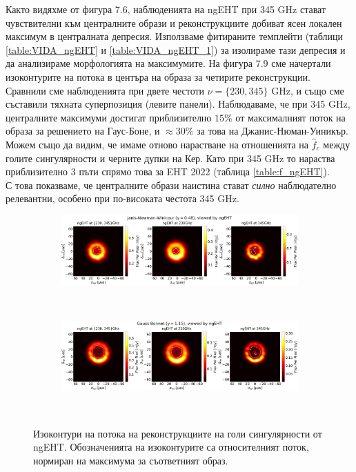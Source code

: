 Както видяхме от фигура 7.6, наблюденията на ngEHT при 345 GHz стават чувствителни към централните образи и реконструкциите добиват ясен локален максимум в централната депресия. Използваме фитираните темплейти (таблици \ref{table:VIDA_ngEHT} и \ref{table:VIDA_ngEHT_1}) за изолираме тази депресия и да анализираме морфологията на максимумите. На фигура 7.9 сме начертали изоконтурите на потока в центъра на образа за четирите реконструкции. Сравнили сме наблюденията при двете честоти $\nu = \{230, 345\}$ GHz, и също сме съставили тяхната суперпозиция (левите панели). Наблюдаваме, че при 345 GHz, централните максимуми достигат приблизително $15\%$ от максималният поток на образа за решението на Гаус-Боне, и $\approx 30\%$ за това на Джанис-Нюман-Уиникър. Можем също да видим, че имаме отново нарастване на отношенията на $\hat{f}_c$ между голите сингулярности и черните дупки на Кер. Като при 345 GHz то нараства приблизително 3 пъти спрямо това за EHT 2022 (таблица \ref{table:f_ngEHT}).\\

С това показваме, че централните образи наистина стават \emph{силно} наблюдателно релевантни, особено при по-високата честота 345 GHz. 

\begin{figure}[h!]
	\centering
	\begin{subfigure}{12cm}
		\hspace{-1.5cm}
		\includegraphics[scale = 0.2]{Superpos_Compare_JNW.png}
	\end{subfigure}\\
	\begin{subfigure}{12cm}
		\hspace{-1.5cm}
		\includegraphics[scale = 0.2]{Superpos_Compare_GB.png}
	\end{subfigure}\\
	\label{isoflux_ngEHT}
	\caption[Изоконтури на потока на реконструкциите на голи сингулярности от ngEHT.]{\small Изоконтури на потока на реконструкциите на голи сингулярности от ngEHT. Обозначенията на изоконтурите са относителният поток, нормиран на максимума за съответният образ.} 
\end{figure}

